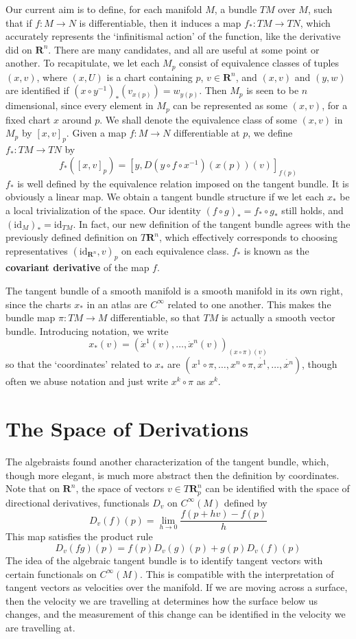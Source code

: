 Our current aim is to define, for each manifold $M$, a bundle $TM$ over $M$, such that if $f:M \to N$ is differentiable, then it induces a map $f_*:TM \to TN$, which accurately represents the `infinitismal action' of the function, like the derivative did on $\mathbf{R}^n$. There are many candidates, and all are useful at some point or another. To recapitulate, we let each $M_p$ consist of equivalence classes of tuples $(x,v)$, where $(x,U)$ is a chart containing $p$, $v \in \mathbf{R}^n$, and $(x,v)$ and $(y,w)$ are identified if $(x \circ y^{-1})_*(v_{x(p)}) = w_{y(p)}$. Then $M_p$ is seen to be $n$ dimensional, since every element in $M_p$ can be represented as some $(x,v)$, for a fixed chart $x$ around $p$. We shall denote the equivalence class of some $(x,v)$ in $M_p$ by $[x,v]_p$. Given a map $f: M \to N$ differentiable at $p$, we define $f_*: TM \to TN$ by
%
\[ f_*([x,v]_p) = [y, D(y \circ f \circ x^{-1})(x(p))(v)]_{f(p)} \]
%
$f_*$ is well defined by the equivalence relation imposed on the tangent bundle. It is obviously a linear map. We obtain a tangent bundle structure if we let each $x_*$ be a local trivialization of the space. Our identity $(f \circ g)_* = f_* \circ g_*$ still holds, and $(\text{id}_M)_* = \text{id}_{TM}$. In fact, our new definition of the tangent bundle agrees with the previously defined definition on $T\mathbf{R}^n$, which effectively corresponds to choosing representatives $(\text{id}_{\mathbf{R}^n}, v)_p$ on each equivalence class. $f_*$ is known as the {\bf covariant derivative} of the map $f$.

The tangent bundle of a smooth manifold is a smooth manifold in its own right, since the charts $x_*$ in an atlas are $C^\infty$ related to one another. This makes the bundle map $\pi: TM \to M$ differentiable, so that $TM$ is actually a smooth vector bundle. Introducing notation, we write
%
\[ x_*(v) = (\dot{x}^1(v), \dots, \dot{x}^n(v))_{(x \circ \pi)(v)} \]
%
so that the `coordinates' related to $x_*$ are $(x^1 \circ \pi, \dots, x^n \circ \pi, \dot{x^1}, \dots, \dot{x^n})$, though often we abuse notation and just write $x^k \circ \pi$ as $x^k$.

\section{The Space of Derivations}

The algebraists found another characterization of the tangent bundle, which, though more elegant, is much more abstract then the definition by coordinates. Note that on $\mathbf{R}^n$, the space of vectors $v \in T\mathbf{R}^n_p$ can be identified with the space of directional derivatives, functionals $D_v$ on $C^\infty(M)$ defined by
%
\[ D_v(f)(p) = \lim_{h \to 0} \frac{f(p + hv) - f(p)}{h} \]
%
This map satisfies the product rule
%
\[ D_v(fg)(p) = f(p) D_v(g)(p) + g(p) D_v(f)(p) \]
%
The idea of the algebraic tangent bundle is to identify tangent vectors with certain functionals on $C^\infty(M)$. This is compatible with the interpretation of tangent vectors as velocities over the manifold. If we are moving across a surface, then the velocity we are travelling at determines how the surface below us changes, and the measurement of this change can be identified in the velocity we are travelling at.

